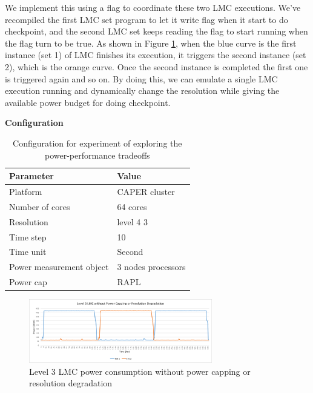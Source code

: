 \documentclass[10pt, conference, compsocconf]{IEEEtran}
\begin{document}
We implement this using a flag to coordinate these two LMC executions. We've recompiled the first LMC set program to let it write flag when it start to do checkpoint, and the second LMC set keeps reading the flag to start running when the flag turn to be true. As shown in Figure \ref{fig:lev3withoutpowercap}, when the blue curve is the first instance (set 1) of LMC finishes its execution, it triggers the second instance (set 2), which is the orange curve. Once the second instance is completed the first one is triggered again and so on. By doing this, we can emulate a single LMC execution running and dynamically change the resolution while giving the available power budget for doing checkpoint.



\textbf{Configuration}
\begin{table}[H]
\begin{center}
\begin{tabular}{|l|l|}
	\hline
	\textbf{Parameter} & \textbf{Value}\\ \hline
    Platform & CAPER cluster\\ 		\hline
    Number of cores & 64 cores\\
	\hline
    Resolution & level 4 3\\
    \hline
    Time step & 10\\
    \hline
    Time unit & Second\\
    \hline
    Power measurement object & 3 nodes processors\\
    \hline
    Power cap & RAPL\\
    \hline
\end{tabular}
\end{center}
\caption{Configuration for experiment of exploring the power-performance tradeoffs 
}
\label{table:table_tradeoff}
\end{table}



\begin{figure}[H]
	\centering
    \includegraphics[width=8cm]{figs/lev3withoutpowercap.png}
        \caption{Level 3 LMC power consumption without power capping or resolution degradation}
        \label{fig:lev3withoutpowercap}
\end{figure}
\end{document}
